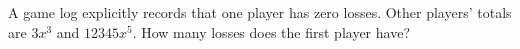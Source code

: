 A game log explicitly records that one player has zero losses. Other players' totals are $3x^3$ and $12345x^5$. How many losses does the first player have?
